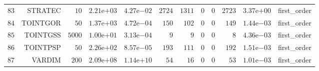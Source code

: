 \begin{longtable}{rrrrrrrrrrrr}
  \(    83\) & STRATEC & \(    10\) & \( 2.21\)e\(+03\) & \( 4.27\)e\(-02\) & \(  2724\) & \(  1311\) & \(     0\) & \(     0\) & \(  2723\) & \( 3.37\)e\(+00\) & first\_order \\
  \(    84\) & TOINTGOR & \(    50\) & \( 1.37\)e\(+03\) & \( 4.72\)e\(-04\) & \(   150\) & \(   102\) & \(     0\) & \(     0\) & \(   149\) & \( 1.44\)e\(-03\) & first\_order \\
  \(    85\) & TOINTGSS & \(  5000\) & \( 1.00\)e\(+01\) & \( 3.13\)e\(-04\) & \(     9\) & \(     9\) & \(     0\) & \(     0\) & \(     8\) & \( 4.36\)e\(-03\) & first\_order \\
  \(    86\) & TOINTPSP & \(    50\) & \( 2.26\)e\(+02\) & \( 8.57\)e\(-05\) & \(   193\) & \(   111\) & \(     0\) & \(     0\) & \(   192\) & \( 1.51\)e\(-03\) & first\_order \\
  \(    87\) & VARDIM & \(   200\) & \( 2.09\)e\(+08\) & \( 1.14\)e\(+10\) & \(    54\) & \(    16\) & \(     0\) & \(     0\) & \(    53\) & \( 1.01\)e\(-03\) & first\_order \\\hline
\end{longtable}
